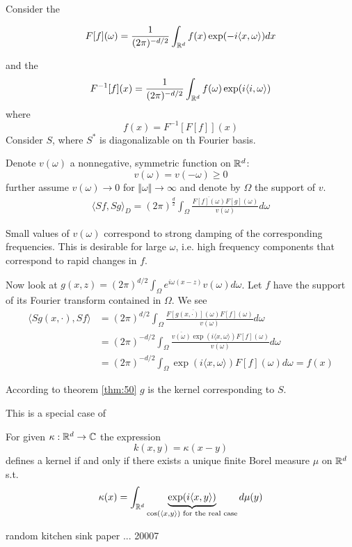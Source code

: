 
Consider the 

\[F[f](\omega)=\frac{1}{(2\pi)^{-d/2}}\int_{\mathbb{R}^d}f(x)\exp(-i\langle x,\omega\rangle)dx\]

and the  
\[F^{-1}[f](x)=\frac{1}{(2\pi)^{-d/2}}\int_{\mathbb{R}^d}f(\omega)\exp(i\langle i,\omega\rangle)\]
where
\[f(x)=F^{-1}[F[f]](x)\]
Consider $S$, where $S^*$ is diagonalizable on th Fourier basis.

Denote $v(\omega)$ a nonnegative, symmetric function on $\mathbb{R}^d$:
\[v(\omega)=v(-\omega)\geq 0\]
further assume $v(\omega)\to0$ for $\Vert\omega\Vert\to\infty$ and denote by 
$\Omega$ the support of $v$.
\begin{align*}
    \langle Sf,Sg\rangle_D=(2\pi)^{\frac{d}{2}}\int_\Omega \frac{\overline{F[f](\omega)}F[g](\omega)}{v(\omega)}d\omega
\end{align*}

Small values of $v(\omega)$ correspond to strong damping of the corresponding frequencies.
This is desirable for large $\omega$, i.e. high frequency components that correspond to 
rapid changes in $f$.

Now look at $g(x,z)=(2\pi)^{d/2}\int_\Omega e^{i\omega(x-z)}v(\omega)d\omega$. Let $f$
have the support of its Fourier transform contained in $\Omega$. We see 
\begin{align*}
    \langle Sg(x,\cdot),Sf\rangle &= (2\pi)^{d/2}\int_\Omega \frac{\overline{F[g(x,\cdot)](\omega)}F[f](\omega)}{v(\omega)}d\omega\\
    &=(2\pi)^{-d/2}\int_\Omega \frac{\overline{v(\omega)}\exp(i\langle x,\omega\rangle)F[f](\omega)}{v(\omega)}d\omega\\
    &=(2\pi)^{-d/2}\int_\Omega \exp(i\langle x,\omega\rangle)F[f](\omega)d\omega=f(x)
\end{align*}

According to theorem \ref{thm:50} $g$ is the kernel corresponding to $S$.

This is a special case of 
\begin{theorem*}
    For given $\kappa:\mathbb{R}^d\to\mathbb{C}$ the expression
    \[k(x,y)=\kappa(x-y)\] defines a kernel if and only if there exists 
    a unique finite Borel measure $\mu$ on $\mathbb{R}^d$ s.t.
    \[\kappa(x)=\int_{\mathbb{R}^d}\underbrace{\exp(i\langle x,y\rangle)}_{\cos(\langle x,y\rangle)\text{ for the real case}}d\mu(y)\] 
\end{theorem*}

\begin{aremark}
    random kitchen sink paper ... 20007
\end{aremark}